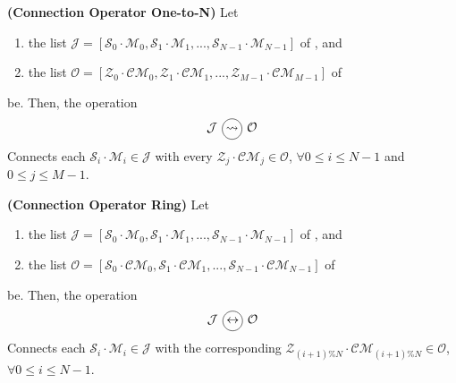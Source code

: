 \begin{definition}\label{op_conn:1ton}
{\bf (Connection Operator One-to-N)} Let 
\begin{enumerate} 
\item the list $\mathcal{J} = \left[\mathcal{S}_0\cdot \mathcal{M}_0, \mathcal{S}_1\cdot \mathcal{M}_1, ..., \mathcal{S}_{N-1}\cdot \mathcal{M}_{N-1}\right]$ of \jacks, and 
\item the list $\mathcal{O} = \left[\mathcal{Z}_0\cdot \mathcal{CM}_0, \mathcal{Z}_1\cdot \mathcal{CM}_1, ..., \mathcal{Z}_{M-1}\cdot \mathcal{CM}_{M-1}\right]$ of \outlets{} 
\end{enumerate} be. Then, the operation 
\[
\mathcal{J} \poslop{\rightsquigarrow} \mathcal{O}
\]
Connects each \jack{} $\mathcal{S}_i\cdot \mathcal{M}_i \in \mathcal{J}$ with every \outlet{} $\mathcal{Z}_j\cdot \mathcal{CM}_j \in \mathcal{O}$, $\forall 0 \leq i \leq N-1$ and $0 \leq j \leq M-1$.
\end{definition}

\begin{definition}\label{op_conn:ring}
{\bf (Connection Operator Ring)} Let 
\begin{enumerate} 
\item the list $\mathcal{J} = \left[\mathcal{S}_0\cdot \mathcal{M}_0, \mathcal{S}_1\cdot \mathcal{M}_1, ..., \mathcal{S}_{N-1}\cdot \mathcal{M}_{N-1}\right]$ of \jacks, and 
\item the list $\mathcal{O} = \left[\mathcal{S}_0\cdot \mathcal{CM}_0, \mathcal{S}_1\cdot \mathcal{CM}_1, ..., \mathcal{S}_{N-1}\cdot \mathcal{CM}_{N-1}\right]$ of \outlets{} 
\end{enumerate} be. Then, the operation 
\[
\mathcal{J} \poslop{\leftrightarrow} \mathcal{O}
\]
Connects each \jack{} $\mathcal{S}_i\cdot \mathcal{M}_i \in \mathcal{J}$ with the corresponding \outlet{} $\mathcal{Z}_{(i+1)\%N}\cdot \mathcal{CM}_{(i+1)\%N} \in \mathcal{O}$, $\forall 0 \leq i \leq N-1$.
\end{definition}


